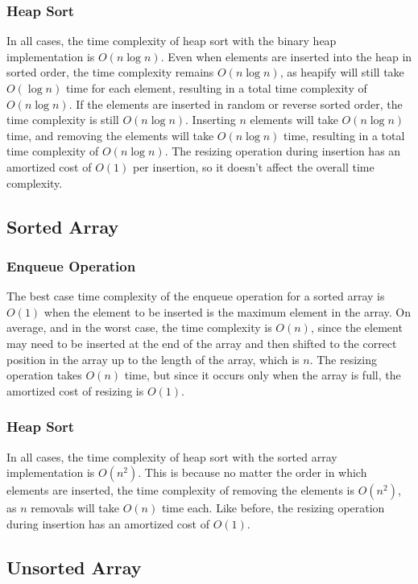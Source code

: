 \documentclass{article}
\begin{document}
\subsubsection{Heap Sort}
In all cases, the time complexity of heap sort with the binary heap implementation is $O(n \log n)$. 
Even when elements are inserted into the heap in sorted order, the time complexity remains $O(n \log n)$, as heapify will still take $O(\log n)$ time for each element, resulting in a total time complexity of $O(n \log n)$. 
If the elements are inserted in random or reverse sorted order, the time complexity is still $O(n \log n)$. 
Inserting $n$ elements will take $O(n \log n)$ time, and removing the elements will take $O(n \log n)$ time, resulting in a total time complexity of $O(n \log n)$. 
The resizing operation during insertion has an amortized cost of $O(1)$ per insertion, so it doesn't affect the overall time complexity.

\subsection{Sorted Array}
\subsubsection{Enqueue Operation}
The best case time complexity of the enqueue operation for a sorted array is $O(1)$ when the element to be inserted is the maximum element in the array. 
On average, and in the worst case, the time complexity is $O(n)$, since the element may need to be inserted at the end of the array and then shifted to the correct position in the array up to the length of the array, which is $n$. 
The resizing operation takes $O(n)$ time, but since it occurs only when the array is full, the amortized cost of resizing is $O(1)$.

\subsubsection{Heap Sort}
In all cases, the time complexity of heap sort with the sorted array implementation is $O(n^2)$. 
This is because no matter the order in which elements are inserted, the time complexity of removing the elements is $O(n^2)$, as $n$ removals will take $O(n)$ time each. 
Like before, the resizing operation during insertion has an amortized cost of $O(1)$.

\subsection{Unsorted Array}
\end{document}
